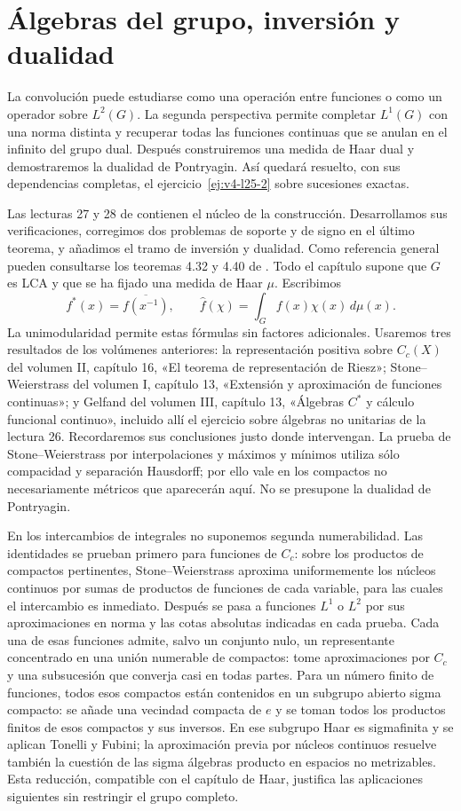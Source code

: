 \chapter{Álgebras del grupo, inversión y dualidad}\label{cap:v4-16}
La convolución puede estudiarse como una operación entre funciones o como un operador sobre $L^2(G)$. La segunda perspectiva permite completar $L^1(G)$ con una norma distinta y recuperar todas las funciones continuas que se anulan en el infinito del grupo dual. Después construiremos una medida de Haar dual y demostraremos la dualidad de Pontryagin. Así quedará resuelto, con sus dependencias completas, el ejercicio~\ref{ej:v4-l25-2} sobre sucesiones exactas.

Las lecturas 27 y 28 de \cite{valencia4} contienen el núcleo de la construcción. Desarrollamos sus verificaciones, corregimos dos problemas de soporte y de signo en el último teorema, y añadimos el tramo de inversión y dualidad. Como referencia general pueden consultarse los teoremas 4.32 y 4.40 de \cite{folland2016}. Todo el capítulo supone que $G$ es LCA y que se ha fijado una medida de Haar $\mu$. Escribimos
\[
 f^*(x)=\overline{f(x^{-1})},\qquad
 \widehat f(\chi)=\int_G f(x)\chi(x)\,d\mu(x).
\]
La unimodularidad permite estas fórmulas sin factores adicionales. Usaremos tres resultados de los volúmenes anteriores: la representación positiva sobre $C_c(X)$ del volumen II, capítulo 16, «El teorema de representación de Riesz»; Stone--Weierstrass del volumen I, capítulo 13, «Extensión y aproximación de funciones continuas»; y Gelfand del volumen III, capítulo 13, «Álgebras $C^*$ y cálculo funcional continuo», incluido allí el ejercicio sobre álgebras no unitarias de la lectura 26. Recordaremos sus conclusiones justo donde intervengan. La prueba de Stone--Weierstrass por interpolaciones y máximos y mínimos utiliza sólo compacidad y separación Hausdorff; por ello vale en los compactos no necesariamente métricos que aparecerán aquí. No se presupone la dualidad de Pontryagin.

En los intercambios de integrales no suponemos segunda numerabilidad. Las identidades se prueban primero para funciones de $C_c$: sobre los productos de compactos pertinentes, Stone--Weierstrass aproxima uniformemente los núcleos continuos por sumas de productos de funciones de cada variable, para las cuales el intercambio es inmediato. Después se pasa a funciones $L^1$ o $L^2$ por sus aproximaciones en norma y las cotas absolutas indicadas en cada prueba. Cada una de esas funciones admite, salvo un conjunto nulo, un representante concentrado en una unión numerable de compactos: tome aproximaciones por $C_c$ y una subsucesión que converja casi en todas partes. Para un número finito de funciones, todos esos compactos están contenidos en un subgrupo abierto sigma compacto: se añade una vecindad compacta de $e$ y se toman todos los productos finitos de esos compactos y sus inversos. En ese subgrupo Haar es sigmafinita y se aplican Tonelli y Fubini; la aproximación previa por núcleos continuos resuelve también la cuestión de las sigma álgebras producto en espacios no metrizables. Esta reducción, compatible con el capítulo de Haar, justifica las aplicaciones siguientes sin restringir el grupo completo.

